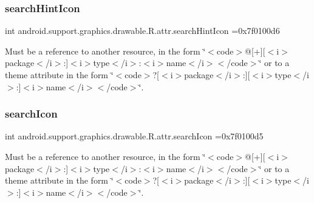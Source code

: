 \subsubsection{\texorpdfstring{search\+Hint\+Icon}{searchHintIcon}}
{\footnotesize\ttfamily int android.\+support.\+graphics.\+drawable.\+R.\+attr.\+search\+Hint\+Icon =0x7f0100d6\hspace{0.3cm}{\ttfamily [static]}}

Must be a reference to another resource, in the form \char`\"{}$<$code$>$@\mbox{[}+\mbox{]}\mbox{[}$<$i$>$package$<$/i$>$\+:\mbox{]}$<$i$>$type$<$/i$>$\+:$<$i$>$name$<$/i$>$$<$/code$>$\char`\"{} or to a theme attribute in the form \char`\"{}$<$code$>$?\mbox{[}$<$i$>$package$<$/i$>$\+:\mbox{]}\mbox{[}$<$i$>$type$<$/i$>$\+:\mbox{]}$<$i$>$name$<$/i$>$$<$/code$>$\char`\"{}. \mbox{\label{classandroid_1_1support_1_1graphics_1_1drawable_1_1R_1_1attr_ade659221d4dc6e71c19a6a8784b7fc5b}} 
\subsubsection{\texorpdfstring{search\+Icon}{searchIcon}}
{\footnotesize\ttfamily int android.\+support.\+graphics.\+drawable.\+R.\+attr.\+search\+Icon =0x7f0100d5\hspace{0.3cm}{\ttfamily [static]}}

Must be a reference to another resource, in the form \char`\"{}$<$code$>$@\mbox{[}+\mbox{]}\mbox{[}$<$i$>$package$<$/i$>$\+:\mbox{]}$<$i$>$type$<$/i$>$\+:$<$i$>$name$<$/i$>$$<$/code$>$\char`\"{} or to a theme attribute in the form \char`\"{}$<$code$>$?\mbox{[}$<$i$>$package$<$/i$>$\+:\mbox{]}\mbox{[}$<$i$>$type$<$/i$>$\+:\mbox{]}$<$i$>$name$<$/i$>$$<$/code$>$\char`\"{}. \mbox{\label{classandroid_1_1support_1_1graphics_1_1drawable_1_1R_1_1attr_a0d4f58b04a5775486b496ca0941bf80c}} 
